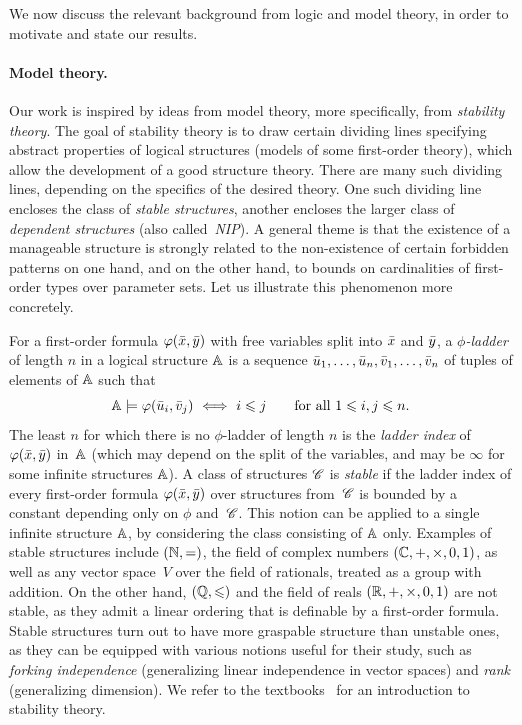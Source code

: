 \smallskip We now discuss the relevant background from logic and model
theory, in order to motivate and state our results.



\paragraph{Model theory.}Our work is inspired by ideas from model
theory, more specifically, from \emph{stability theory}.  The goal of
{stability theory} is to draw certain dividing lines specifying
abstract properties of logical structures (models of some first-order
theory), which allow the development of a good structure theory. There
are many such dividing lines, depending on the specifics of the
desired theory. One such dividing line encloses the class of
\emph{stable structures}, another encloses the larger class of
\emph{dependent structures} (also called~\emph{NIP}).  A general theme
is that the existence of a manageable structure is strongly related to
the non-existence of certain forbidden patterns on one hand, and on
the other hand, to bounds on cardinalities of first-order types over
parameter sets.  Let us illustrate this phenomenon more concretely.

For a first-order formula $\varphi(\bar{x},\bar{y})$ with free variables
split into $\bar{x}$ and $\bar{y}$, a \emph{$\phi$-ladder} of length
$n$ in a logical structure $\mathbb A$ is a sequence
$\bar{u}_1,\ldots, \bar{u}_{n}, \bar{v}_1,\ldots, \bar{v}_{n}$ of
tuples of elements of $\mathbb A$ such that
$$\strA\models\phi(\tup{u}_i,\tup{v}_j)\ \Longleftrightarrow\ 
i\leq j\qquad \text {for all $1\leq i,j\le n$.}$$
The least $n$ for which there is no $\phi$-ladder of length $n$ is the
\emph{ladder index} of $\varphi(\bar{x},\bar{y})$ in~$\mathbb A$ (which may
depend on the split of the variables, and may be $\infty$ for some
infinite structures $\mathbb A$). A class of structures $\mathscr{C}$ is
\emph{stable} if the ladder index of every first-order formula
$\varphi(\bar{x},\bar{y})$ over structures from~$\mathscr{C}$ is bounded by a
constant depending only on $\phi$ and~$\mathscr{C}$. This notion can be
applied to a single infinite structure $\mathbb A$, by considering the
class consisting of $\mathbb A$ only.  Examples of stable structures
include $(\mathbb N,=)$, the field of complex numbers
$(\mathbb C,+,\times,0,1)$, as well as any vector space~$V$ over the
field of rationals, treated as a group with addition. On the other
hand, $(\mathbb Q,\leqslant)$ and the field of reals $(\mathbb R,+,\times,0,1)$
are not stable, as they admit a linear ordering that is definable by a
first-order formula.  Stable structures turn out to have more
graspable structure than unstable ones, as they can be equipped with
various notions useful for their study, such as \emph{forking
  independence} (generalizing linear independence in vector spaces)
and \emph{rank} (generalizing dimension).  We refer to the
textbooks~\cite{pillay,tent2012course} for an introduction to
stability theory.

